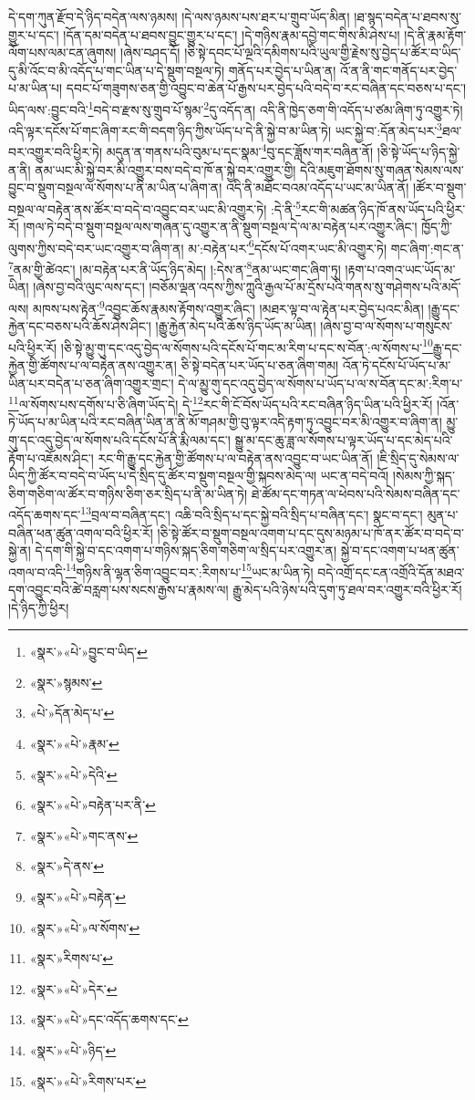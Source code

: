 དེ་དག་ཀུན་རྫོབ་དེ་ཉིད་བདེན་ལས་ཉམས། །དེ་ལས་ཉམས་པས་ཐར་པ་གྲུབ་ཡོད་མིན། །ཐ་སྙད་བདེན་པ་ཐབས་སུ་གྱུར་པ་དང་། །དོན་དམ་བདེན་པ་ཐབས་བྱུང་གྱུར་པ་དང་། །དེ་གཉིས་རྣམ་དབྱེ་གང་གིས་མི་ཤེས་པ། །དེ་ནི་རྣམ་རྟོག་ལོག་པས་ལམ་ངན་ཞུགས། །ཞེས་བཤད་དོ། །ཅི་སྟེ་དབང་པོ་ལྔའི་དམིགས་པའི་ཡུལ་གྱི་རྗེས་སུ་བྱེད་པ་ཚོར་བ་ཡིད་དུ་མི་འོང་བ་མི་འདོད་པ་གང་ཡིན་པ་དེ་སྡུག་བསྔལ་ཏེ། གནོད་པར་བྱེད་པ་ཡིན་ན། འོ་ན་ནི་གང་གནོད་པར་བྱེད་པ་མ་ཡིན་པ། དབང་པོ་གཟུགས་ཅན་གྱི་འབྱུང་བ་ཆེན་པོ་རྒྱས་པར་བྱེད་པའི་བདེ་བ་རང་བཞིན་དང་བཅས་པ་དང་། ཡིད་ལས་:བྱུང་བའི་\footnote{«སྣར་»«པེ་»བྱུང་བ་ཡིད་}བདེ་བ་རྫས་སུ་གྲུབ་པོ་སྙམ་\footnote{«སྣར་»སྙམས་}དུ་འདོད་ན། འདི་ནི་ཁྱེད་ཅག་གི་འདོད་པ་ཙམ་ཞིག་ཏུ་འགྱུར་ཏེ། འདི་ལྟར་དངོས་པོ་གང་ཞིག་རང་གི་བདག་ཉིད་ཀྱིས་ཡོད་པ་དེ་ནི་སྐྱེ་བ་མ་ཡིན་ཏེ། ཡང་སྐྱེ་བ་:དོན་མེད་པར་\footnote{«པེ་»དོན་མེད་པ་}ཐལ་བར་འགྱུར་བའི་ཕྱིར་ཏེ། མདུན་ན་གནས་པའི་བུམ་པ་དང་སྣམ་\footnote{«སྣར་»«པེ་»རྣམ་}བུ་དང་ཟློས་གར་བཞིན་ནོ། །ཅི་སྟེ་ཡོད་པ་ཉིད་སྐྱེ་ན་ནི། ནམ་ཡང་མི་སྐྱེ་བར་མི་འགྱུར་བས་བདེ་བ་ཁོ་ན་སྐྱེ་བར་འགྱུར་གྱི། དེའི་མཇུག་ཐོགས་སུ་གཞན་སེམས་ལས་བྱུང་བ་སྡུག་བསྔལ་ལ་སོགས་པ་ནི་མ་ཡིན་པ་ཞིག་ན། འདི་ནི་མཐོང་བའམ་འདོད་པ་ཡང་མ་ཡིན་ནོ། །ཚོར་བ་སྡུག་བསྔལ་ལ་བརྟེན་ནས་ཚོར་བ་བདེ་བ་འབྱུང་བར་ཡང་མི་འགྱུར་ཏེ། :དེ་ནི་\footnote{«སྣར་»«པེ་»དེའི་}རང་གི་མཚན་ཉིད་ཁོ་ནས་ཡོད་པའི་ཕྱིར་རོ། །གལ་ཏེ་བདེ་བ་སྡུག་བསྔལ་ལས་གཞན་དུ་འགྱུར་ན་ནི་སྡུག་བསྔལ་དེ་ལ་མ་བརྟེན་པར་འགྱུར་ཞིང་། ཁྱོད་ཀྱི་ལུགས་ཀྱིས་བདེ་བར་ཡང་འགྱུར་བ་ཞིག་ན། མ་:བརྟེན་པར་\footnote{«སྣར་»«པེ་»བརྟེན་པར་ནི་}དངོས་པོ་འགར་ཡང་མི་འགྱུར་ཏེ། གང་ཞིག་:གང་ན་\footnote{«སྣར་»«པེ་»གང་ནས་}ནམ་གྱི་ཚེའང་། །མ་བརྟེན་པར་ནི་ཡོད་ཉིད་མེད། །:དེས་ན་\footnote{«སྣར་»དེ་ནས་}ནམ་ཡང་གང་ཞིག་ཏུ། །རྟག་པ་འགའ་ཡང་ཡོད་མ་ཡིན། །ཞེས་བྱ་བའི་ལུང་ལས་དང་། །བཅོམ་ལྡན་འདས་ཀྱིས་ཀླུའི་རྒྱལ་པོ་མ་དྲོས་པའི་གནས་སུ་གཤེགས་པའི་མདོ་ལས། མཁས་པས་རྟེན་\footnote{«སྣར་»«པེ་»བརྟེན་}འབྱུང་ཆོས་རྣམས་རྟོགས་འགྱུར་ཞིང་། །མཐར་ལྟ་བ་ལ་རྟེན་པར་བྱེད་པའང་མིན། །རྒྱུ་དང་རྐྱེན་དང་བཅས་པའི་ཆོས་ཤེས་ཤིང་། །རྒྱུ་རྐྱེན་མེད་པའི་ཆོས་ཉིད་ཡོད་མ་ཡིན། །ཞེས་བྱ་བ་ལ་སོགས་པ་གསུངས་པའི་ཕྱིར་རོ། །ཅི་སྟེ་མྱུ་གུ་དང་འདུ་བྱེད་ལ་སོགས་པའི་དངོས་པོ་གང་མ་རིག་པ་དང་ས་བོན་:ལ་སོགས་པ་\footnote{«སྣར་»«པེ་»ལ་སོགས་}རྒྱུ་དང་རྐྱེན་གྱི་ཚོགས་པ་ལ་བརྟེན་ནས་འགྱུར་ན། ཅི་སྟེ་བདེན་པར་ཡོད་པ་ཅན་ཞིག་གམ། འོན་ཏེ་དངོས་པོ་ཡོད་པ་མ་ཡིན་པར་བདེན་པ་ཅན་ཞིག་འགྱུར་གྲང་། དེ་ལ་མྱུ་གུ་དང་འདུ་བྱེད་ལ་སོགས་པ་ཡོད་པ་ལ་ས་བོན་དང་མ་:རིག་པ་\footnote{«སྣར་»རིགས་པ་}ལ་སོགས་པས་དགོས་པ་ཅི་ཞིག་ཡོད་དེ། དེ་\footnote{«སྣར་»«པེ་»དེར་}རང་གི་ངོ་བོས་ཡོད་པའི་རང་བཞིན་ཉིད་ཡིན་པའི་ཕྱིར་རོ། །འོན་ཏེ་ཡོད་པ་མ་ཡིན་པའི་རང་བཞིན་ཡིན་ན་ནི་མོ་གཤམ་གྱི་བུ་ལྟར་འདི་རྟག་ཏུ་འབྱུང་བར་མི་འགྱུར་བ་ཞིག་ན། མྱུ་གུ་དང་འདུ་བྱེད་ལ་སོགས་པའི་དངོས་པོ་ནི་རྨི་ལམ་དང་། སྒྱུ་མ་དང་ཆུ་ཟླ་ལ་སོགས་པ་ལྟར་ཡོད་པ་དང་མེད་པའི་རྟོག་པ་འཇོམས་ཤིང་། རང་གི་རྒྱུ་དང་རྐྱེན་གྱི་ཚོགས་པ་ལ་བརྟེན་ནས་འབྱུང་བ་ཡང་ཡིན་ནོ། །ཇི་སྲིད་དུ་སེམས་ལ་ཡིད་ཀྱི་ཚོར་བ་བདེ་བ་ཡོད་པ་དེ་སྲིད་དུ་ཚོར་བ་སྡུག་བསྔལ་གྱི་སྐབས་མེད་ལ། ཡང་ན་བདེ་བའོ། །སེམས་ཀྱི་སྐད་ཅིག་གཅིག་ལ་ཚོར་བ་གཉིས་ཅིག་ཅར་སྲིད་པ་ནི་མ་ཡིན་ཏེ། ཐེ་ཚོམ་དང་གཏན་ལ་ཕེབས་པའི་སེམས་བཞིན་དང་འདོད་ཆགས་དང་\footnote{«སྣར་»«པེ་»དང་འདོད་ཆགས་དང་}བྲལ་བ་བཞིན་དང་། འཆི་བའི་སྲིད་པ་དང་སྐྱེ་བའི་སྲིད་པ་བཞིན་དང་། སྣང་བ་དང་། མུན་པ་བཞིན་ཕན་ཚུན་འགལ་བའི་ཕྱིར་རོ། །ཅི་སྟེ་ཚོར་བ་སྡུག་བསྔལ་འགག་པ་དང་དུས་མཉམ་པ་ཁོ་ནར་ཚོར་བ་བདེ་བ་སྐྱེ་ན། དེ་དག་གི་སྐྱེ་བ་དང་འགག་པ་གཉིས་སྐད་ཅིག་གཅིག་ལ་སྲིད་པར་འགྱུར་ན། སྐྱེ་བ་དང་འགག་པ་ཕན་ཚུན་འགལ་བ་འདི་\footnote{«སྣར་»«པེ་»ཉིད་}གཉིས་ནི་ལྷན་ཅིག་འབྱུང་བར་:རིགས་པ་\footnote{«སྣར་»«པེ་»རིགས་པར་}ཡང་མ་ཡིན་ཏེ། བདེ་འགྲོ་དང་ངན་འགྲོའི་དོན་མཐའ་དག་འབྱུང་བའི་ཚེ་བརླག་པས་སངས་རྒྱས་པ་རྣམས་ལ། རྒྱུ་མེད་པའི་ཉེས་པའི་དུག་ཏུ་ཐལ་བར་འགྱུར་བའི་ཕྱིར་རོ། །དེ་ཉིད་ཀྱི་ཕྱིར། 